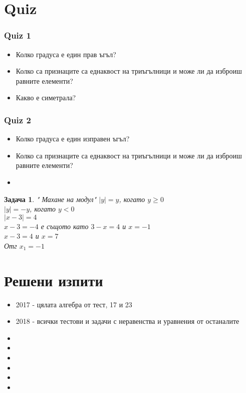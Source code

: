 \documentclass{article}
\theoremstyle{plain}
\newtheorem{problem}{Задача}
\begin{document}
\newpage
\section{Quiz}

\subsubsection{Quiz 1}
\begin{itemize}
	\item Колко градуса е един прав ъгъл?
	\item Колко са признаците са еднаквост на триъгълници и може ли да изброиш равните елементи?
	
	
	\item Какво е симетрала?
\end{itemize}


\subsubsection{Quiz 2}
\begin{itemize}
	\item Колко градуса е един изправен ъгъл?
	\item Колко са признаците са еднаквост на триъгълници и може ли да изброиш равните елементи?
	\item 
\end{itemize}


\begin{problem}" Махане на модул"
	$|y| = y   $, когато $y\geq 0 $\\
	$|y| = -y  $, когато $y<0 $\\
	
	$\left| x -3 \right| = 4 $\\
	$ x - 3= -4 $ е същото като  $ 3-x = 4 $ и $x = -1 $\\
	$ x - 3 = 4 $ и  $x = 7 $\\
	
	Отг $x_1 = -1  $
\end{problem}





\section{Решени изпити}

\begin{itemize}
	\item 2017 - цялата алгебра от тест, 17 и 23
	\item 2018 - всички тестови и задачи с неравенства и уравнения от останалите 
	\item 
	\item 
	\item 
	\item 
	\item 
	\item 
	
\end{itemize}
\end{document}
